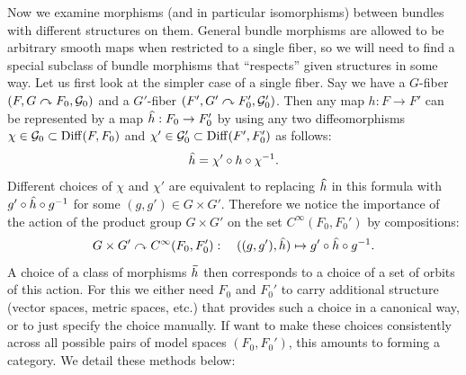 Now we examine morphisms (and in particular isomorphisms) between bundles with different structures on them. General bundle morphisms are allowed to be arbitrary smooth maps when restricted to a single fiber, so we will need to find a special subclass of bundle morphisms that ``respects'' given structures in some way. Let us first look at the simpler case of a single fiber. Say we have a $G$-fiber $(F,G\curvearrowright F_0,\mathcal{G}_0)$ and a $G'$-fiber $(F',G'\curvearrowright F_0',\mathcal{G}_0')$. Then any map $h:F\to F'$ can be represented by a map $\wh{h}:F_0\to F_0'$ by using any two diffeomorphisms $\chi\in\mathcal{G}_0\subset \operatorname{Diff}(F,F_0)$ and $\chi'\in\mathcal{G}_0'\subset \operatorname{Diff}(F',F_0')$ as follows:
\[\wh{h}=\chi'\circ h\circ \chi^{-1}.\label{eq g-fiber f-hat}\]
Different choices of $\chi$ and $\chi'$ are equivalent to replacing $\wh{h}$ in this formula with $g'\circ \wh{h}\circ g^{-1}$ for some $(g,g')\in G\times G'$. Therefore we notice the importance of the action of the product group $G\times G'$ on the set $C^\infty(F_0,F_0')$ by compositions:
\[G\times G'\acts C^\infty(F_0,F_0'):\quad ((g,g'),\wh{h})\mapsto g'\circ \wh{h}\circ g^{-1}.\label{eq gg' action}\] 
A choice of a class of morphisms $\wt h$ then corresponds to a choice of a set of orbits of this action. For this we either need $F_0$ and $F_0'$ to carry additional structure (vector spaces, metric spaces, etc.) that provides such a choice in a canonical way, or to just specify the choice manually. If want to make these choices consistently across all possible pairs of model spaces $(F_0,F_0')$, this amounts to forming a category. We detail these methods below:
